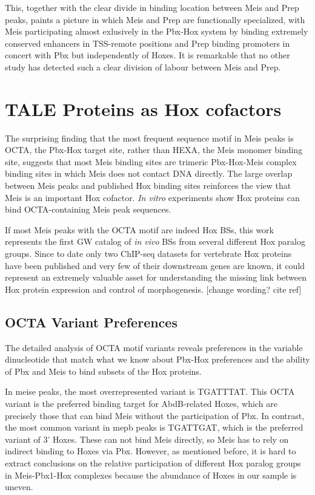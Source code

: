 This, together with the clear divide in binding location between Meis and Prep peaks, paints a picture in which Meis and Prep are functionally specialized, with Meis participating almost exlusively in the Pbx-Hox system by binding extremely conserved enhancers in \ac{TSS}-remote positions and Prep binding promoters in concert with Pbx but independently of Hoxes. It is remarkable that no other study has detected such a clear division of labour between Meis and Prep.

\section{TALE Proteins as Hox cofactors}

The surprising finding that the most frequent sequence motif in Meis peaks is \ac{OCTA}, the Pbx-Hox target site, rather than \ac{HEXA}, the Meis monomer binding site, suggests that most Meis binding sites are trimeric Pbx-Hox-Meis complex binding sites in which Meis does not contact DNA directly. The large overlap between Meis peaks and published Hox binding sites reinforces the view that Meis is an important Hox cofactor. \textit{In vitro} experiments show Hox proteins can bind \ac{OCTA}-containing Meis peak sequences. 


If most Meis peaks with the \ac{OCTA} motif are indeed Hox \acp{BS}, this work represents the first \ac{GW} catalog of \textit{in vivo} \acp{BS} from several different Hox paralog groups. Since to date only two ChIP-seq datasets for vertebrate Hox proteins have been published \parencite{Jung2010, Donaldson2012} and very few of their downstream genes are known, it could represent an extremely valuable asset for understanding the missing link between Hox protein expression and control of morphogenesis. [change wording? cite ref]

\subsection{OCTA Variant Preferences}

The detailed analysis of \ac{OCTA} motif variants reveals preferences in the variable dinucleotide that match what we know about Pbx-Hox preferences and the ability of Pbx and Meis to bind subsets of the Hox proteins. 

In \ac{meise} peaks, the most overrepresented variant is TGATTTAT. This \ac{OCTA} variant is the preferred binding target for AbdB-related Hoxes, which are precisely those that can bind Meis without the participation of Pbx. In contrast, the most common variant in \ac{mepb} peaks is TGATTGAT, which is the preferred variant of 3' Hoxes. These can not bind Meis directly, so Meis has to rely on indirect binding to Hoxes via Pbx. However, as mentioned before, it is hard to extract conclusions on the relative participation of different Hox paralog groups in Meis-Pbx1-Hox complexes because the abundance of Hoxes in our sample is uneven. %

